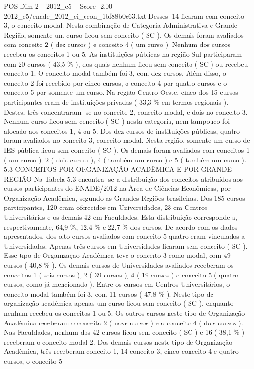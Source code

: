 \begin{textsample}{POS Dim 2 – 2012\_c5 – Score -2.00 – 2012\_c5/enade\_2012\_ci\_econ\_1bf88b0c63.txt}
Desses, 14 ficaram com conceito 3, o conceito modal.
Nesta combinação de Categoria Administrativa e Grande Região, somente um curso ficou sem conceito ( SC ).
Os demais foram avaliados com conceito 2 ( dez cursos ) e conceito 4 ( um curso ).
Nenhum dos cursos recebeu os conceitos 1 ou 5.
As instituições públicas na região Sul participaram com 20 cursos ( 43,5 \% ), dos quais nenhum ficou sem conceito ( SC ) ou recebeu conceito 1.
O conceito modal também foi 3, com dez cursos.
Além disso, o conceito 2 foi recebido por cinco cursos, o conceito 4 por quatro cursos e o conceito 5 por somente um curso.
Na região Centro-Oeste, cinco dos 15 cursos participantes eram de instituições privadas ( 33,3 \% em termos regionais ).
Destes, três concentraram -se no conceito 2, conceito modal, e dois no conceito 3.
Nenhum curso ficou sem conceito ( SC ) nesta categoria, nem tampouco foi alocado aos conceitos 1, 4 ou 5.
Dos dez cursos de instituições públicas, quatro foram avaliados no conceito 3, conceito modal.
Nesta região, somente um curso de IES pública ficou sem conceito ( SC ).
Os demais foram avaliados com conceitos 1 ( um curso ), 2 ( dois cursos ), 4 ( também um curso ) e 5 ( também um curso ). 5.3 CONCEITOS POR ORGANIZAÇÃO ACADÊMICA E POR GRANDE REGIÃO Na Tabela 5.3 encontra -se a distribuição dos conceitos atribuídos aos cursos participantes do ENADE/2012 na Área de Ciências Econômicas, por Organização Acadêmica, segundo as Grandes Regiões brasileiras.
Dos 185 cursos participantes, 120 eram oferecidos em Universidades, 23 em Centros Universitários e os demais 42 em Faculdades.
Esta distribuição corresponde a, respectivamente, 64,9 \%, 12,4 \% e 22,7 \% dos cursos.
De acordo com os dados apresentados, dos oito cursos avaliados com conceito 5 quatro eram vinculados a Universidades.
Apenas três cursos em Universidades ficaram sem conceito ( SC ).
Esse tipo de Organização Acadêmica teve o conceito 3 como modal, com 49 cursos ( 40,8 \% ).
Os demais cursos de Universidades avaliados receberam os conceitos 1 ( seis cursos ), 2 ( 39 cursos ), 4 ( 19 cursos ) e conceito 5 ( quatro cursos, como já mencionado ).
Entre os cursos em Centros Universitários, o conceito modal também foi 3, com 11 cursos ( 47,8 \% ).
Neste tipo de organização acadêmica apenas um curso ficou sem conceito ( SC ), enquanto nenhum recebeu os conceitos 1 ou 5.
Os outros cursos neste tipo de Organização Acadêmica receberam o conceito 2 ( nove cursos ) e o conceito 4 ( dois cursos ).
Nas Faculdades, nenhum dos 42 cursos ficou sem conceito ( SC ) e 16 ( 38,1 \% ) receberam o conceito modal 2.
Dos demais cursos neste tipo de Organização Acadêmica, três receberam conceito 1, 14 conceito 3, cinco conceito 4 e quatro cursos, o conceito 5.

\end{textsample}
